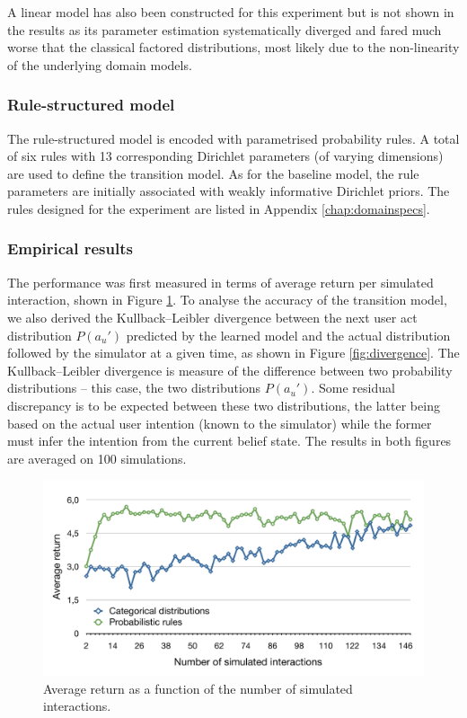 A linear model has also been constructed for this experiment but is not shown in the results as its parameter estimation systematically diverged and fared much worse that the classical factored distributions, most likely due to the non-linearity of the underlying domain models. 


\subsubsection*{Rule-structured model}

The rule-structured model is encoded with parametrised probability rules. A total of six rules with 13 corresponding Dirichlet parameters (of varying dimensions) are used to define the transition model.   As for the baseline model, the rule parameters are initially associated with weakly informative Dirichlet priors.  The rules designed for the experiment are listed in Appendix \ref{chap:domainspecs}.

\subsubsection*{Empirical results}

The performance was first measured in terms of average return per simulated interaction, shown in Figure \ref{fig:return_exp21}.  To analyse the accuracy of the transition model, we also derived the Kullback--Leibler divergence \citep{KLDIVERGE} between the next user act distribution $P(a_u')$ predicted by the learned model and the actual distribution followed by the simulator at a given time, as shown in Figure \ref{fig:divergence}.  The Kullback--Leibler divergence is measure of the difference between two probability distributions -- this case, the two distributions $P(a_u')$.  Some residual discrepancy is to be expected between these two distributions, the latter being based on the actual user intention (known to the simulator) while the former must infer the intention from the current belief state. The results in both figures are averaged on 100 simulations.

\begin{figure}[p]
\centering
\includegraphics[scale=0.42]{imgs/return_exp21.pdf}
\caption{Average return as a function of the number of simulated interactions.}
\label{fig:return_exp21}
\end{figure}

